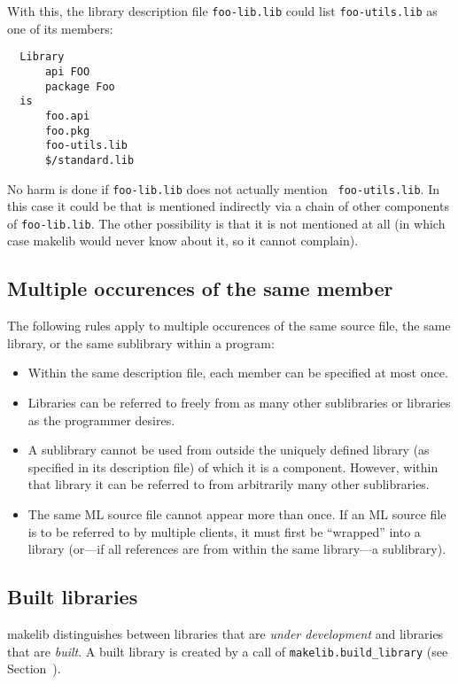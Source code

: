 With this, the library description file {\tt foo-lib.lib} could list
{\tt foo-utils.lib} as one of its members:

\begin{verbatim}
  Library
      api FOO
      package Foo
  is
      foo.api
      foo.pkg
      foo-utils.lib
      $/standard.lib
\end{verbatim}

No harm is done if {\tt foo-lib.lib} does not actually mention {\tt
foo-utils.lib}.  In this case it could be that is mentioned indirectly via a chain of other components
of {\tt foo-lib.lib}.  The other possibility is that it is not
mentioned at all (in which case makelib would never know about it, so it
cannot complain).

\subsection{Multiple occurences of the same member}
\label{sec:multioccur}

The following rules apply to multiple occurences of the same source
file, the same library, or the same sublibrary within a program:

\begin{itemize}
\item Within the same description file, each member can be specified
at most once.
\item Libraries can be referred to freely from as many other sublibraries or
libraries as the programmer desires.
\item A sublibrary cannot be used from outside the uniquely defined library
(as specified in its description file) of which it is a component.
However, within that library it can be referred to from arbitrarily
many other sublibraries.
\item The same ML source file cannot appear more than once.  If an ML
source file is to be referred to by multiple clients, it must first be
``wrapped'' into a library (or---if all references are from within the
same library---a sublibrary).
\end{itemize}

\subsection{Built libraries}
\label{sec:built}

makelib distinguishes between libraries that are {\em under development}
and libraries that are {\em built}.  A built library is created by a
call of {\tt makelib.build_library} (see Section~).

